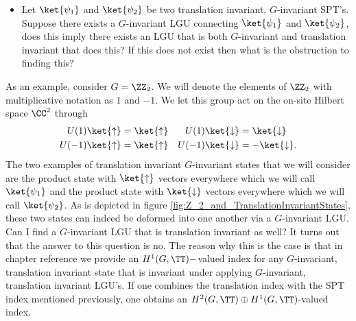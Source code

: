 \begin{itemize}
	\item Let $\ket{\psi_1}$ and $\ket{\psi_2}$ be two translation invariant, $G$-invariant SPT's. Suppose there exists a $G$-invariant LGU connecting $\ket{\psi_1}$ and $\ket{\psi_2}$, does this imply there exists an LGU that is both $G$-invariant and translation invariant that does this? If this does not exist then what is the obstruction to finding this?
\end{itemize}
As an example, consider $G=\ZZ_2$. We will denote the elements of $\ZZ_2$ with multiplicative notation as $1$ and $-1$. We let this group act on the on-site Hilbert space $\CC^2$ through
\begin{align}
	U(1)\ket{\uparrow}&=\ket{\uparrow}&U(1)\ket{\downarrow}&=\ket{\downarrow}\\
	U(-1)\ket{\uparrow}&=\ket{\uparrow}&U(-1)\ket{\downarrow}&=-\ket{\downarrow}.
\end{align}
The two examples of translation invariant $G$-invariant states that we will consider are the product state with $\ket{\uparrow}$ vectors everywhere which we will call $\ket{\psi_1}$ and the product state with $\ket{\downarrow}$ vectors everywhere which we will call $\ket{\psi_2}$. As is depicted in figure \ref{fig:Z_2_and_TranslationInvariantStates}, these two states can indeed be deformed into one another via a $G$-invariant LGU. Can I find a $G$-invariant LGU that is translation invariant as well? It turns out that the answer to this question is no. The reason why this is the case is that in chapter {\color{red}reference} we provide an $H^1(G,\TT)-$valued index for any $G$-invariant, translation invariant state that is invariant under applying $G$-invariant, translation invariant LGU's. If one combines the translation index with the SPT index mentioned previously, one obtains an $H^2(G,\TT)\oplus H^1(G,\TT)$-valued index.
